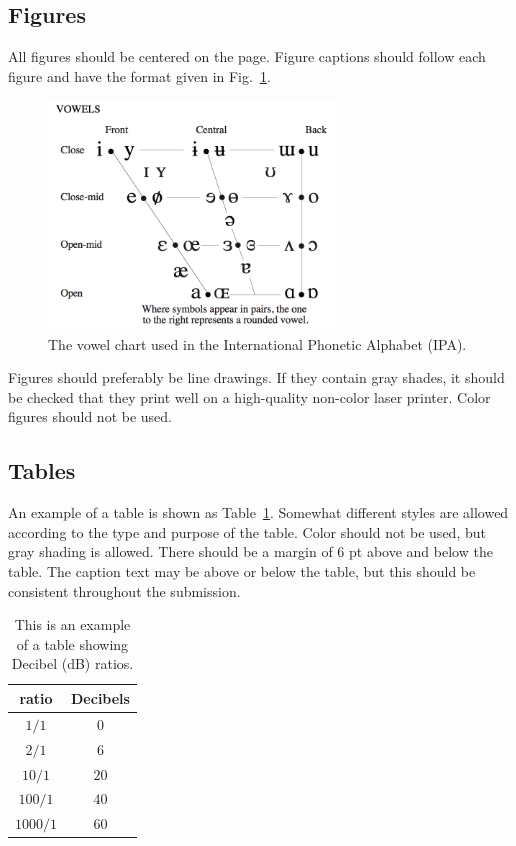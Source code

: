 \documentclass{tls}
\begin{document}
\subsection{Figures}

All figures should be centered on the page. Figure captions should follow each
figure and have the format given in Fig.~\ref{fig:vowels}.

\begin{figure}[ht]
  \begin{center}
    \includegraphics[width=3in]{Example-IPA.png}
  \end{center}
  \caption{The vowel chart used in the International Phonetic Alphabet (IPA).}
  \label{fig:vowels}
\end{figure}

Figures should preferably be line drawings. If they contain gray shades, it should be checked that they print well on a high-quality non-color laser printer. Color figures should not be used.

\subsection{Tables}

An example of a table is shown as Table~\ref{tab:decibel}. Somewhat different styles are allowed according to the type and purpose of the table. Color should not be used, but gray shading is allowed. There should be a margin of 6 pt above and below the table. The caption text may be above or below the table, but this should be consistent throughout the submission.

\begin{table}[ht]
  \begin{center}
    \begin{tabular}{|c|c|}
      \hline
      \rowcolor[gray]{.75}
      \hline
      ratio    & Decibels \\
      \hline
      $1/1$    & $0$   \\
      $2/1$    & $6$   \\
      $10/1$   & $20$  \\
      $100/1$  & $40$  \\
      $1000/1$ & $60$  \\
      \hline
    \end{tabular}
  \end{center}
  \caption{This is an example of a table showing Decibel (dB) ratios.}
  \label{tab:decibel}
\end{table}
\end{document}
